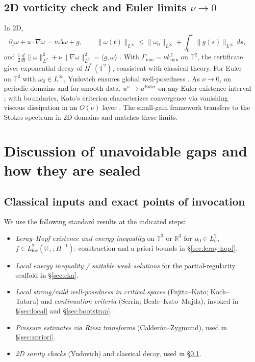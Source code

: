 \IfFileExists{nyjm.cls}{\documentclass[11pt]{nyjm}}{\documentclass[11pt]{amsart}}
\newcommand{\R}{\mathbb{R}}
\newcommand{\T}{\mathbb{T}}
\theoremstyle{plain}
\theoremstyle{definition}
\theoremstyle{remark}
\begin{document}
\subsection{2D vorticity check and Euler limits $\nu\to0$}\label{subsec:2D-euler}
In 2D,
\[
\partial_t\omega+u\cdot\nabla\omega=\nu\Delta\omega+g,\qquad
\|\omega(t)\|_{L^\infty}\le \|\omega_0\|_{L^\infty}+\int_0^t\|g(s)\|_{L^\infty}\,ds,
\]
and $\tfrac12\frac{d}{dt}\|\omega\|_{L^2}^2+\nu\|\nabla\omega\|_{L^2}^2=\langle g,\omega\rangle$ \cite{Ladyzhenskaya1969,Temam2001,MajdaBertozzi2002}. With $\Gamma_{\min}=\nu k_{\min}^2$ on $\T^2$, the certificate gives exponential decay of $\dot H^\sigma(\T^2)$, consistent with classical theory. For Euler on $\T^2$ with $\omega_0\in L^\infty$, Yudovich ensures global well-posedness \cite{Yudovich1963}. As $\nu\to0$, on periodic domains and for smooth data, $u^\nu\to u^{\mathrm{Euler}}$ on any Euler existence interval \cite{MajdaBertozzi2002}; with boundaries, Kato’s criterion characterizes convergence via vanishing viscous dissipation in an $O(\nu)$ layer \cite{KatoZero1984}. The small-gain framework transfers to the Stokes spectrum in 2D domains and matches these limits.

\section{Discussion of unavoidable gaps and how they are sealed}\label{sec:gaps}

\subsection{Classical inputs and exact points of invocation}\label{subsec:classical-inputs}
We use the following standard results at the indicated steps:
\begin{itemize}
  \item \emph{Leray–Hopf existence and energy inequality} on $\T^3$ or $\R^3$ for $u_0\in L^2_\sigma$, $f\in L^2_{\mathrm{loc}}(\R_+;H^{-1})$: construction and a priori bounds in \S\ref{sec:leray-hopf}. \cite{Leray1934,Hopf1951,Temam2001,Sohr2001}
  \item \emph{Local energy inequality / suitable weak solutions} for the partial-regularity scaffold in \S\ref{sec:ckn}. \cite{CKN1982,Lin1998}
  \item \emph{Local strong/mild well-posedness in critical spaces} (Fujita–Kato; Koch–Tataru) and \emph{continuation criteria} (Serrin; Beale–Kato–Majda), invoked in \S\ref{sec:local} and \S\ref{sec:bootstrap}. \cite{FujitaKato1964,Kato1984,KochTataru2001,Serrin1962,BealeKatoMajda1984,EscauriazaSereginSverak2003}
  \item \emph{Pressure estimates via Riesz transforms} (Calderón–Zygmund), used in \S\ref{sec:apriori}. \cite{Stein1993,Temam2001}
  \item \emph{2D sanity checks} (Yudovich) and classical decay, used in \S\ref{subsec:2D-euler}. \cite{Yudovich1963,MajdaBertozzi2002}
\end{itemize}
\end{document}
